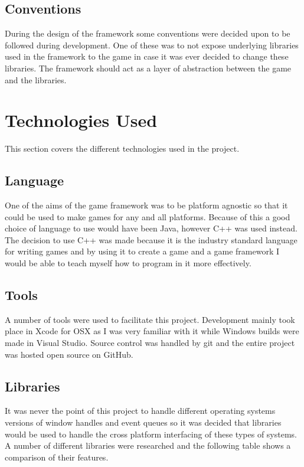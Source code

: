 \documentclass[]{report}
\begin{document}
		\subsection{Conventions}
		During the design of the framework some conventions were decided upon to be followed during development. One of these was to not expose underlying libraries used in the framework to the game in case it was ever decided to change these libraries. The framework should act as a layer of abstraction between the game and the libraries.
		
	\section{Technologies Used}
		This section covers the different technologies used in the project.
		\subsection{Language}
		One of the aims of the game framework was to be platform agnostic so that it could be used to make games for any and all platforms. Because of this a good choice of language to use would have been Java, however C++ was used instead. The decision to use C++ was made because it is the industry standard language for writing games and by using it to create a game and a game framework I would be able to teach myself how to program in it more effectively.
		\subsection{Tools}
		A number of tools were used to facilitate this project. Development mainly took place in Xcode for OSX as I was very familiar with it while Windows builds were made in Visual Studio. Source control was handled by git and the entire project was hosted open source on GitHub.
		\subsection{Libraries}
		It was never the point of this project to handle different operating systems versions of window handles and event queues so it was decided that libraries would be used to handle the cross platform interfacing of these types of systems. A number of different libraries were researched and the following table shows a comparison of their features.
		
\end{document}
